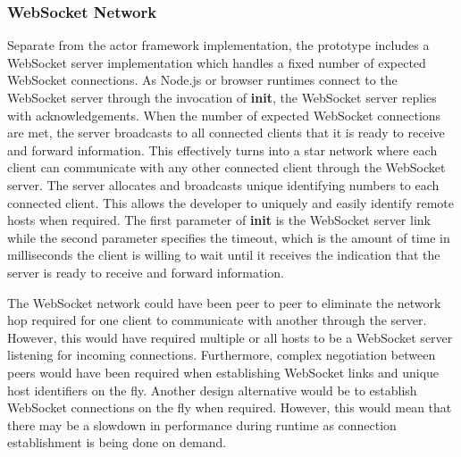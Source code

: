 \documentclass[12pt, a4paper]{report}
\theoremstyle{definition}
\theoremstyle{definition}%
\theoremstyle{definition}%
\theoremstyle{definition}%
\theoremstyle{definition}%
\theoremstyle{definition}%
\begin{document}
\subsubsection{WebSocket Network}
Separate from the actor framework implementation, the prototype includes a WebSocket server implementation which handles a fixed number of expected WebSocket connections. As Node.js or browser runtimes connect to the WebSocket server through the invocation of \textbf{init}, the WebSocket server replies with acknowledgements. When the number of expected WebSocket connections are met, the server broadcasts to all connected clients that it is ready to receive and forward information. This effectively turns into a star network where each client can communicate with any other connected client through the WebSocket server. The server allocates and broadcasts unique identifying numbers to each connected client. This allows the developer to uniquely and easily identify remote hosts when required. The first parameter of \textbf{init} is the WebSocket server link while the second parameter specifies the timeout, which is the amount of time in milliseconds the client is willing to wait until it receives the indication that the server is ready to receive and forward information.

The WebSocket network could have been peer to peer to eliminate the network hop required for one client to communicate with another through the server. However, this would have required multiple or all hosts to be a WebSocket server listening for incoming connections. Furthermore, complex negotiation between peers would have been required when establishing WebSocket links and unique host identifiers on the fly. Another design alternative would be to establish WebSocket connections on the fly when required. However, this would mean that there may be a slowdown in performance during runtime as connection establishment is being done on demand.
\end{document}
